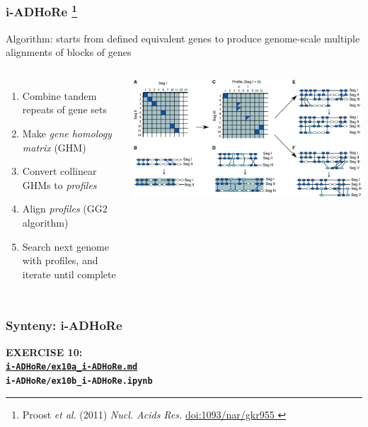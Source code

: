 %
\begin{frame}
  \frametitle{i-ADHoRe
    \footnote{\tiny{Proost \textit{et al}. (2011) \textit{Nucl. Acids Res.} \href{http://dx.doi.org/10..1093/nar/gkr955}{doi:1093/nar/gkr955
  }}}
}
  Algorithm: starts from defined equivalent genes to produce genome-scale multiple alignments of blocks of genes
  {\small
  \begin{columns}[T] 
      \begin{enumerate}
        \item Combine tandem repeats of gene sets
        \item Make \textcolor{hutton_green}{\textit{gene homology matrix} (GHM)}
        \item Convert collinear GHMs to \textcolor{hutton_blue}{\textit{profiles}}
        \item Align \textit{profiles} (GG2 algorithm)
        \item Search next genome with profiles, and \textcolor{hutton_purple}{iterate until complete}
      \end{enumerate}  
        \includegraphics[width=\textwidth]{images/i-adhore_algorithm}
    \end{columns}
    }    
\end{frame}

%
\begin{frame}
  \frametitle{Synteny: i-ADHoRe}
  \Large{
    \textcolor{hutton_blue}{
      \textbf{
      EXERCISE 10: \\
{\small \href{https://github.com/widdowquinn/Teaching-2015-03-17-UoD_compgenvis/blob/master/exercises/i-ADHoRe/ex10a_i-ADHoRe.md}{\texttt{i-ADHoRe/ex10a\_i-ADHoRe.md}} \\
      \texttt{i-ADHoRe/ex10b\_i-ADHoRe.ipynb}}
      }
    }
  }
\end{frame}